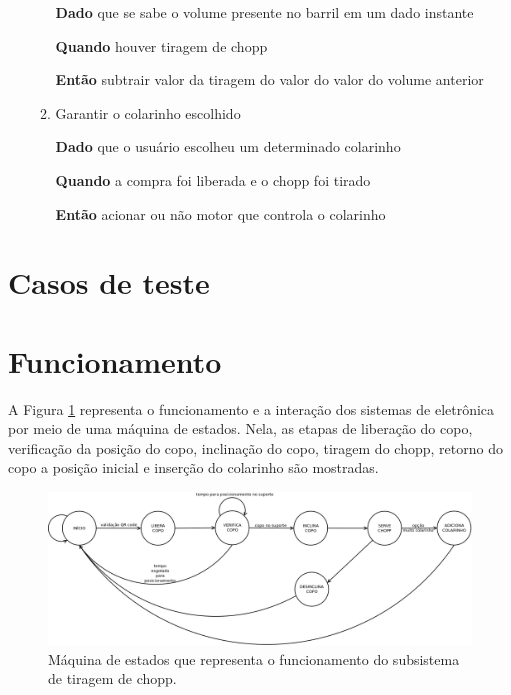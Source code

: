 \begin{enumerate}
\begin{enumerate}
\textbf{Dado} que se sabe o volume presente no barril em um dado instante

\textbf{Quando} houver tiragem de chopp

\textbf{Então} subtrair valor da tiragem do valor do valor do volume anterior



\item Garantir o colarinho escolhido

\textbf{Dado} que o usuário escolheu um determinado colarinho

\textbf{Quando} a compra foi liberada e o chopp foi  tirado

\textbf{Então} acionar ou não motor que controla o colarinho


\end{enumerate}

\end{enumerate}


\section{Casos de teste}

\section{Funcionamento}

A Figura \ref{state_machine} representa o funcionamento e a interação dos sistemas de eletrônica por meio
de uma máquina de estados. Nela, as etapas de liberação do copo, verificação da posição do copo, inclinação do copo,
tiragem do chopp, retorno do copo a posição inicial e inserção do colarinho são mostradas.

\begin{figure}[!htb]
            \centering
         	\includegraphics[scale= 0.25]{figuras/maquina_estado_eletronica.png}
            \caption{Máquina de estados que representa o funcionamento do subsistema de tiragem de chopp.}
            \label{state_machine}
\end{figure}
 
